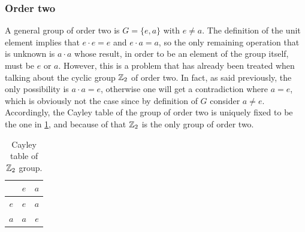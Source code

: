 \subsubsection{Order two}
A general group of order two is $G = \{e,a\}$ with $e \neq a$. The definition of the unit element implies that $e \cdot e = e$ and $e \cdot a = a$, so the only remaining operation that is unknown is $a \cdot a$ whose result, in order to be an element of the group itself, must be $e$ or $a$. However, this is a problem that has already been treated when talking about the cyclic group $\mathbb{Z}_2$ of order two. In fact, as said previously, the only possibility is $a \cdot a = e$, otherwise one will get a contradiction where $a = e$, which is obviously not the case since by definition of $G$ consider $a \neq e$. Accordingly, the Cayley table of the group of order two is uniquely fixed to be the one in \ref{tab: Z2 Cayley table}, and because of that $\mathbb{Z}_2$ is the only group of order two.
\begin{table}[h]
    \centering
    \begin{tabular}{|c|cc|}
        \hline
        & $e$ & $a$ \\ \hline
        $e$ & $e$ & $a$ \\
        $a$ & $a$ & $e$ \\ \hline
    \end{tabular}
    \caption{Cayley table of $\mathbb{Z}_2$ group.}
    \label{tab: Z2 Cayley table}
\end{table}

